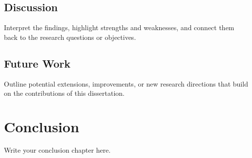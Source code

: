 \documentclass[12pt]{yorkudiss}
\begin{document}
\section{Discussion}
Interpret the findings, highlight strengths and weaknesses, and connect them back to the research questions or objectives.  

\section{Future Work}
Outline potential extensions, improvements, or new research directions that build on the contributions of this dissertation.


\chapter{Conclusion}


Write your conclusion chapter here. 



%
%
%
%
%

\backmatter%
\printbibliography[heading=bibintoc,title={Bibliography}]


\begin{appendices} %

% 



% 

% 

% 

% 

% 

% 

% 



\end{appendices}
\end{document}
